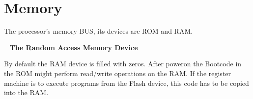 \documentclass[letterpaper,10pt,english]{sphinxmanual}
\begin{document}
\section{Memory}
\label{core:module-py_register_machine2.core.memory}\label{core:memory}

\begin{fulllineitems}
\label{core:py_register_machine2.core.memory.BUS}
The processor's memory BUS, its devices are ROM and RAM.

\end{fulllineitems}


\begin{fulllineitems}
\label{core:py_register_machine2.core.memory.RAM}~\label{core:ram}
\textbf{The Random Access Memory Device}

By default the RAM device is filled with zeros. 
After poweron the Bootcode in the ROM might perform read/write operations on the RAM.
If the register machine is to execute programs from the Flash device, this code
has to be copied into the RAM.

\end{fulllineitems}

\end{document}
